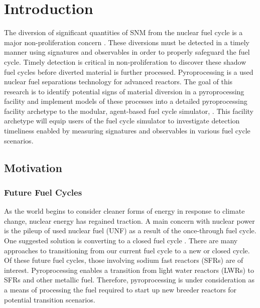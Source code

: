 \chapter[Introduction]{Introduction}
The diversion of significant quantities of \gls{SNM} from the nuclear fuel cycle is a major non-proliferation 
concern \cite{noauthor_serving_2017}. These diversions must be detected in a timely manner using signatures and observables in 
order to properly safeguard the fuel cycle. Timely detection is critical in non-proliferation to discover these shadow fuel cycles
before diverted material is further processed. Pyroprocessing is a used nuclear fuel separations technology for advanced reactors. 
The goal of this research is to identify potential signs of material diversion in a pyroprocessing facility and implement models 
of these processes into a detailed pyroprocessing facility archetype to the modular, agent-based fuel cycle simulator, \Cyclus \cite{huff_fundamental_2016}. This facility archetype will equip users of the \Cyclus fuel cycle simulator to investigate 
detection timeliness enabled by measuring signatures and observables in various fuel cycle scenarios.

\section{Motivation}


\subsection{Future Fuel Cycles}
As the world begins to consider cleaner forms of energy in response to climate change, nuclear energy has regained traction. A main
concern with nuclear power is the pileup of used nuclear fuel (UNF) as a result of the once-through fuel cycle. 
One suggested solution is converting to a closed fuel cycle \cite{wigeland_nuclear_2014}. There are many approaches to transitioning from our current
fuel cycle to a new or closed cycle. Of these future fuel cycles, those involving sodium fast reactors (SFRs) are of interest. 
Pyroprocessing enables a transition from light water reactors (LWRs) to SFRs and other metallic fuel.
Therefore, pyroprocessing is under consideration as a means of processing the fuel required to start up new breeder reactors for potential transition scenarios.

